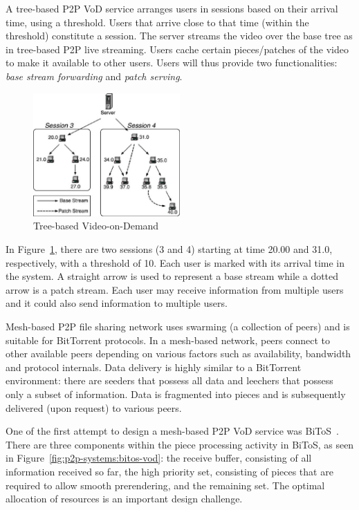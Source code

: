 A tree-based P2P VoD service arranges users in sessions based on their arrival
time, using a threshold. Users that arrive close to that time (within the
threshold) constitute a session. The server streams the video over the base
tree as in tree-based P2P live streaming. Users cache certain pieces/patches
of the video to make it available to other users. Users will thus provide two
functionalities: \textit{base stream forwarding} and \textit{patch serving}.

\begin{figure}
  \centering
  \includegraphics[width=0.5\textwidth]{src/img/p2p-systems/tree-based-vod}
  \caption{Tree-based Video-on-Demand}
  \label{fig:p2p-systems:tree-based-vod}
\end{figure}

In Figure~\ref{fig:p2p-systems:tree-based-vod}, there are two sessions (3 and 4) starting
at time 20.00 and
31.0, respectively, with a threshold of 10. Each user is marked with its
arrival time in the system. A straight arrow is used to represent a base
stream while a dotted arrow is a patch stream. Each user may receive
information from multiple users and it could also send information to multiple
users.

Mesh-based P2P file sharing network uses swarming (a collection of peers) and
is suitable for BitTorrent protocols. In a mesh-based network, peers connect
to other available peers depending on various factors such as availability,
bandwidth and protocol internals. Data delivery is highly similar to a
BitTorrent environment: there are seeders that possess all data and leechers
that possess only a subset of information. Data is fragmented into pieces and
is subsequently delivered (upon request) to various peers.

One of the first attempt to design a mesh-based P2P VoD service was
BiToS~\cite{bitos}. There are three components within the piece processing
activity in BiToS, as seen in Figure~\ref{fig:p2p-systems:bitos-vod}: the
receive buffer, consisting of all information received so far, the high
priority set, consisting of pieces that are required to allow smooth
prerendering, and the remaining set. The optimal allocation of resources is an
important design challenge.

